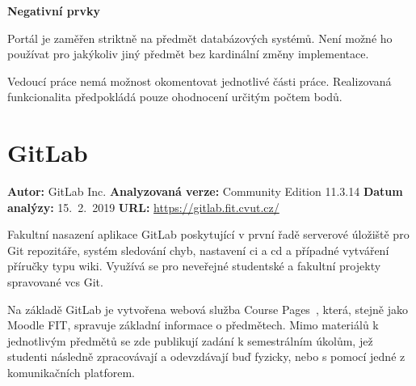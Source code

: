 \textbf{Negativní prvky}
\begin{ul}
   \item Portál je zaměřen striktně na předmět databázových systémů. Není možné ho používat pro jakýkoliv jiný předmět bez kardinální změny implementace.
   \item Vedoucí práce nemá možnost okomentovat jednotlivé části práce. Realizovaná funkcionalita předpokládá pouze ohodnocení určitým počtem bodů.
\end{ul}



\clearpage
\section{GitLab}

\textbf{Autor:} GitLab Inc.\newline
\textbf{Analyzovaná verze:} Community Edition 11.3.14\newline
\textbf{Datum analýzy:} 15.~2.~2019\newline
\textbf{URL:} \url{https://gitlab.fit.cvut.cz/}

Fakultní nasazení aplikace GitLab poskytující v první řadě serverové úložiště pro Git repozitáře, systém sledování chyb, nastavení \gls{ci} a \gls{cd} a případné vytváření příručky typu wiki. Využívá se pro neveřejné studentské a fakultní projekty spravované \gls{vcs} Git.

Na základě GitLab je vytvořena webová služba Course Pages~\cite{courses}, která, stejně jako Moodle FIT, spravuje základní informace o předmětech. Mimo materiálů k jednotlivým předmětů se zde publikují zadání k semestrálním úkolům, jež studenti následně zpracovávají a odevzdávají buď fyzicky, nebo s pomocí jedné z komunikačních platforem.

